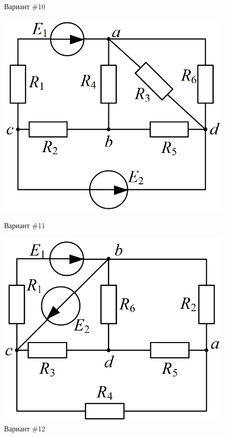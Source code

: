 \begin{figure}[H]
\begin{minipage}{0.48\textwidth}
        \caption{Вариант \#10}
        \label{fig:task_10}
    \end{minipage}
\end{figure}

\begin{figure}[H]
    \centering
    \begin{minipage}{0.48\textwidth}
        \centering
        \includegraphics[width=\textwidth]{images/11_task.png}
        \caption{Вариант \#11}
        \label{fig:task_11}
    \end{minipage}
    \hfill
    \begin{minipage}{0.48\textwidth}
        \centering
        \includegraphics[width=\textwidth]{images/12_task.png}
        \caption{Вариант \#12}
        \label{fig:task_12}
    \end{minipage}
\end{figure}

